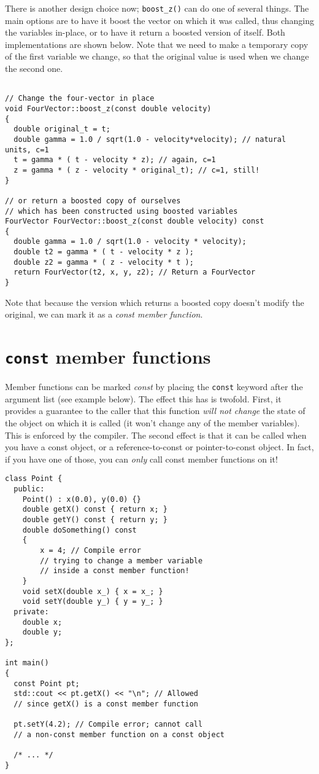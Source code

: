 \documentclass[a4paper]{scrartcl}
\begin{document}
There is another design choice now; \verb|boost_z()| can do one of several things. The main options are to have it boost the vector on which it was called, thus changing the variables in-place, or to have it return a boosted version of itself. Both implementations are shown below. Note that we need to make a temporary copy of the first variable we change, so that the original value is used when we change the second one.

\begin{verbatim}

// Change the four-vector in place
void FourVector::boost_z(const double velocity)
{
  double original_t = t;
  double gamma = 1.0 / sqrt(1.0 - velocity*velocity); // natural units, c=1
  t = gamma * ( t - velocity * z); // again, c=1
  z = gamma * ( z - velocity * original_t); // c=1, still!
}

// or return a boosted copy of ourselves
// which has been constructed using boosted variables
FourVector FourVector::boost_z(const double velocity) const
{
  double gamma = 1.0 / sqrt(1.0 - velocity * velocity);
  double t2 = gamma * ( t - velocity * z );
  double z2 = gamma * ( z - velocity * t );
  return FourVector(t2, x, y, z2); // Return a FourVector
}
\end{verbatim}

Note that because the version which returns a boosted copy doesn't modify the original, we can mark it as a \emph{const member function}.

\section{\texttt{const} member functions}
Member functions can be marked \emph{const} by placing the \verb|const| keyword after the argument list (see example below). The effect this has is twofold. First, it provides a guarantee to the caller that this function \emph{will not change} the state of the object on which it is called (it won't change any of the member variables). This is enforced by the compiler. The second effect is that it can be called when you have a const object, or a reference-to-const or pointer-to-const object. In fact, if you have one of those, you can \emph{only} call const member functions on it!

\begin{verbatim}
class Point {
  public:
    Point() : x(0.0), y(0.0) {}
    double getX() const { return x; }
    double getY() const { return y; }
    double doSomething() const
    {
        x = 4; // Compile error
        // trying to change a member variable
        // inside a const member function!
    }
    void setX(double x_) { x = x_; }
    void setY(double y_) { y = y_; }
  private:
    double x;
    double y;
};

int main()
{
  const Point pt;
  std::cout << pt.getX() << "\n"; // Allowed
  // since getX() is a const member function

  pt.setY(4.2); // Compile error; cannot call
  // a non-const member function on a const object

  /* ... */
}
\end{verbatim}
\end{document}
